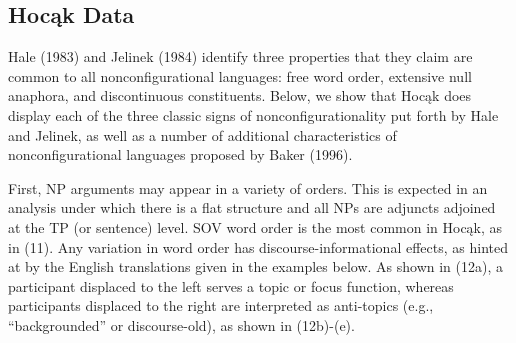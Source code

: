\documentclass[output=paper]{LSP/langsci}
\begin{document}
\subsection{Hoc\k{a}k Data}

Hale (1983) and Jelinek (1984) identify three properties that they claim are common to all nonconfigurational languages: free word order, extensive null anaphora, and discontinuous constituents. Below, we show that Hoc\k{a}k does display each of the three classic signs of nonconfigurationality put forth by Hale and Jelinek, as well as a number of additional characteristics of nonconfigurational languages proposed by Baker (1996).  

First, NP arguments may appear in a variety of orders.  This is expected in an analysis under which there is a flat structure and all NPs are adjuncts adjoined at the TP (or sentence) level. SOV word order is the most common in Hoc\k{a}k, as in (11). Any variation in word order has discourse-informational effects, as hinted at by the English translations given in the examples below. As shown in (12a), a participant displaced to the left serves a topic or focus function, whereas participants displaced to the right are interpreted as anti-topics (e.g., ``backgrounded'' or discourse-old), as shown in (12b)-(e).
\end{document}
